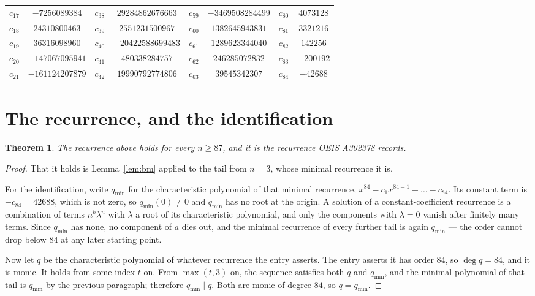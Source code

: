 \documentclass[11pt,a4paper]{article}
\theoremstyle{plain}
\newtheorem{theorem}{Theorem}
\theoremstyle{definition}
\begin{document}
\begin{center}
\begin{tabular}{cccccccc}
$c_{17}$ & $-7256089384$ & $c_{38}$ & $29284862676663$ & $c_{59}$ & $-3469508284499$ & $c_{80}$ & $4073128$ \\
$c_{18}$ & $24310800463$ & $c_{39}$ & $2551231500967$ & $c_{60}$ & $1382645943831$ & $c_{81}$ & $3321216$ \\
$c_{19}$ & $36316098960$ & $c_{40}$ & $-20422588699483$ & $c_{61}$ & $1289623344040$ & $c_{82}$ & $142256$ \\
$c_{20}$ & $-147067095941$ & $c_{41}$ & $480338284757$ & $c_{62}$ & $246285072832$ & $c_{83}$ & $-200192$ \\
$c_{21}$ & $-161124207879$ & $c_{42}$ & $19990792774806$ & $c_{63}$ & $39545342307$ & $c_{84}$ & $-42688$ \\
\end{tabular}
\end{center}

\section{The recurrence, and the identification}

\begin{theorem}
The recurrence above holds for every $n\ge87$, and it is the recurrence OEIS A302378 records.
\end{theorem}

\begin{proof}
That it holds is Lemma~\ref{lem:bm} applied to the tail from $n=3$, whose minimal
recurrence it is.

For the identification, write $q_{\min}$ for the characteristic polynomial of that minimal
recurrence, $x^{84}-c_1x^{84-1}-\dots-c_{84}$. Its constant term is
$-c_{84}=42688$, which is not zero, so $q_{\min}(0)\neq0$ and $q_{\min}$ has no
root at the origin. A solution of a constant-coefficient recurrence is a combination of terms
$n^{k}\lambda^{n}$ with $\lambda$ a root of its characteristic polynomial, and only the
components with $\lambda=0$ vanish after finitely many terms. Since $q_{\min}$ has none, no
component of $a$ dies out, and the minimal recurrence of every further tail is again
$q_{\min}$ --- the order cannot drop below $84$ at any later starting point.

Now let $q$ be the characteristic polynomial of whatever recurrence the entry asserts. The
entry asserts it has order $84$, so $\deg q=84$, and it is monic. It holds from some
index $t$ on. From $\max(t,3)$ on, the sequence satisfies both $q$ and $q_{\min}$, and
the minimal polynomial of that tail is $q_{\min}$ by the previous paragraph; therefore
$q_{\min}\mid q$. Both are monic of degree $84$, so $q=q_{\min}$.
\end{proof}
\end{document}
